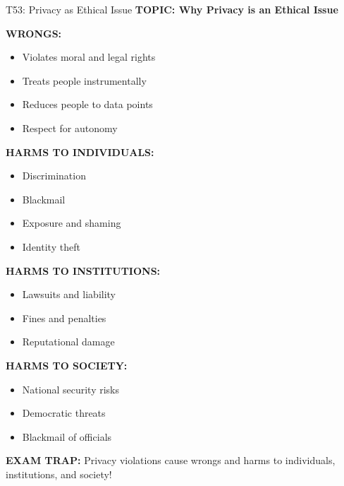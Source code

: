 \documentclass[8pt]{beamer}
\begin{document}
	\begin{frame}{T53: Privacy as Ethical Issue}
		\fontsize{6.5}{7.5}\selectfont
		\textbf{TOPIC: Why Privacy is an Ethical Issue}
		
		\vspace{0.1cm}
		\textbf{WRONGS:}
		\begin{itemize}
			\item Violates moral and legal rights
			\item Treats people instrumentally
			\item Reduces people to data points
			\item Respect for autonomy
		\end{itemize}
		
		\vspace{0.1cm}
		\textbf{HARMS TO INDIVIDUALS:}
		\begin{itemize}
			\item Discrimination
			\item Blackmail
			\item Exposure and shaming
			\item Identity theft
		\end{itemize}
		
		\vspace{0.1cm}
		\textbf{HARMS TO INSTITUTIONS:}
		\begin{itemize}
			\item Lawsuits and liability
			\item Fines and penalties
			\item Reputational damage
		\end{itemize}
		
		\vspace{0.1cm}
		\textbf{HARMS TO SOCIETY:}
		\begin{itemize}
			\item National security risks
			\item Democratic threats
			\item Blackmail of officials
		\end{itemize}
		
		\textcolor{myred}{\textbf{EXAM TRAP:}} Privacy violations cause \textcolor{myblue}{wrongs and harms} to individuals, institutions, and society!
	\end{frame}
	
\end{document}

